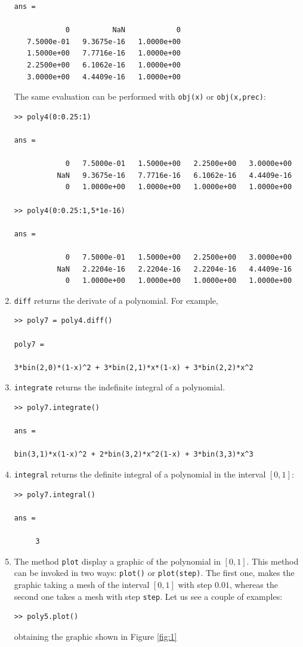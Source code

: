\documentclass[a4paper,10pt]{report}
\begin{document}
\begin{enumerate}
\begin{verbatim}
ans =

            0          NaN            0
   7.5000e-01   9.3675e-16   1.0000e+00
   1.5000e+00   7.7716e-16   1.0000e+00
   2.2500e+00   6.1062e-16   1.0000e+00
   3.0000e+00   4.4409e-16   1.0000e+00
\end{verbatim}
The same evaluation can be performed with \verb"obj(x)" or \verb"obj(x,prec)":
\begin{verbatim}
>> poly4(0:0.25:1)

ans =

            0   7.5000e-01   1.5000e+00   2.2500e+00   3.0000e+00
          NaN   9.3675e-16   7.7716e-16   6.1062e-16   4.4409e-16
            0   1.0000e+00   1.0000e+00   1.0000e+00   1.0000e+00

>> poly4(0:0.25:1,5*1e-16)

ans =

            0   7.5000e-01   1.5000e+00   2.2500e+00   3.0000e+00
          NaN   2.2204e-16   2.2204e-16   2.2204e-16   4.4409e-16
            0   1.0000e+00   1.0000e+00   1.0000e+00   1.0000e+00
\end{verbatim}
\item \verb"diff" returns the derivate of a polynomial. For example,
\begin{verbatim}
>> poly7 = poly4.diff()

poly7 = 

3*bin(2,0)*(1-x)^2 + 3*bin(2,1)*x*(1-x) + 3*bin(2,2)*x^2
\end{verbatim}
\item \verb"integrate" returns the indefinite integral of a polynomial.
\begin{verbatim}
>> poly7.integrate()

ans = 

bin(3,1)*x(1-x)^2 + 2*bin(3,2)*x^2(1-x) + 3*bin(3,3)*x^3
\end{verbatim}
\item \verb"integral" returns the definite integral of a polynomial in the interval $[0,1]$:
\begin{verbatim}
>> poly7.integral()

ans =

     3
\end{verbatim}
\item The method \verb"plot" display a graphic of the polynomial in $[0,1]$. This method
  can be invoked in two ways: \verb"plot()" or \verb"plot(step)". The first one, makes
  the graphic taking a mesh of the interval $[0,1]$ with step $0.01$, whereas the second one
  takes a mesh with step \verb"step". Let us see a couple of examples:
\begin{verbatim}
>> poly5.plot()
\end{verbatim}
obtaining the graphic shown in Figure \ref{fig:1}


\end{enumerate}
\end{document}
